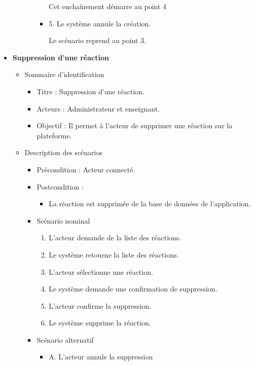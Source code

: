 \begin{itemize}
\begin{itemize}
\begin{itemize}
\begin{itemize}
				                        Cet enchaînement démarre au point 4

				                  \item 5. Le système annule la création.

				                        Le scénario reprend au point 3.
			                  \end{itemize}
		            \end{itemize}
	      \end{itemize}

	\item \textbf{Suppression d’une réaction }
	      \begin{itemize}
		      \item Sommaire d’identification
		            \begin{itemize}
			            \item Titre : Suppression d’une réaction.
			            \item Acteurs : Administrateur et enseignant.
			            \item Objectif : Il permet à l’acteur de supprimer une réaction sur la plateforme.
		            \end{itemize}
		      \item Description des scénarios
		            \begin{itemize}
			            \item Précondition : Acteur connecté.
			            \item Postcondition :
			                  \begin{itemize}
				                  \item La réaction est supprimée de la base de données de l’application.
			                  \end{itemize}
			            \item Scénario nominal
			                  \begin{enumerate}
				                  \item L’acteur demande de la liste des réactions.
				                  \item Le système retourne la liste des réactions.
				                  \item L’acteur sélectionne une réaction.
				                  \item Le système demande une confirmation de suppression.
				                  \item L’acteur confirme la suppression.
				                  \item Le système supprime la réaction.
			                  \end{enumerate}
			            \item Scénario alternatif
			                  \begin{itemize}
				                  \item A. L’acteur annule la suppression


\end{itemize}
\end{itemize}
\end{itemize}
\end{itemize}
